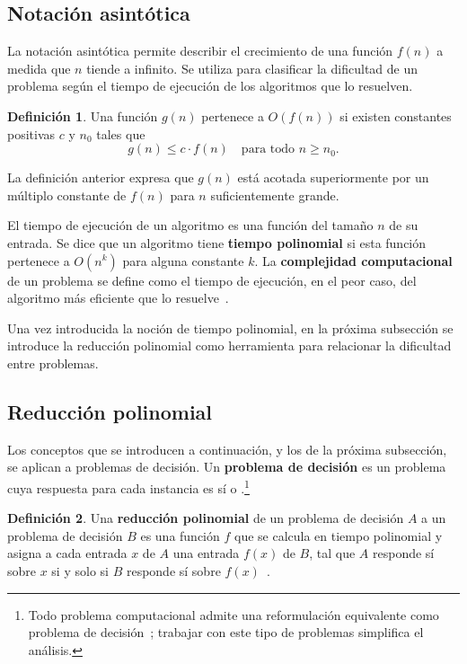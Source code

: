 \documentclass{article}
\theoremstyle{definition}
\newtheorem{definicion}{Definición}
\theoremstyle{plain}
\theoremstyle{remark}
\begin{document}
\subsection{Notación asintótica}

La notación asintótica permite describir el crecimiento de una función
$f(n)$ a medida que $n$ tiende a infinito. Se utiliza para clasificar
la dificultad de un problema según el tiempo de ejecución de los
algoritmos que lo resuelven.

\begin{definicion}
  Una función $g(n)$ pertenece a $O(f(n))$ si existen constantes positivas
  $c$ y $n_0$ tales que
  \[
    g(n) \le c \cdot f(n) \quad \text{para todo } n \ge n_0.
  \]
\end{definicion}

La definición anterior expresa que $g(n)$ está acotada superiormente
por un múltiplo constante de $f(n)$ para $n$ suficientemente grande.

El tiempo de ejecución de un algoritmo es una función del tamaño $n$
de su entrada. Se dice que un algoritmo tiene \textbf{tiempo
  polinomial} si esta función pertenece a $O(n^k)$ para alguna
constante $k$. La \textbf{complejidad computacional} de un problema
se define como el tiempo de ejecución, en el peor caso, del algoritmo
más eficiente que lo resuelve~\cite{hopcroft2006introduction}.

Una vez introducida la noción de tiempo polinomial, en la próxima
subsección se introduce la reducción polinomial como herramienta para
relacionar la dificultad entre problemas.

\subsection{Reducción polinomial}
\label{sec:reduccion}

Los conceptos que se introducen a continuación, y los de la próxima
subsección, se aplican a problemas de decisión. Un \textbf{problema
  de decisión} es un problema cuya respuesta para cada instancia es sí
o .\footnote{Todo problema computacional admite una reformulación
  equivalente como problema de decisión~\cite{hopcroft2006introduction};
  trabajar con este tipo de problemas simplifica el análisis.}

\begin{definicion}
  Una \textbf{reducción polinomial} de un problema de decisión $A$ a un
  problema de decisión $B$ es una función $f$ que se calcula en tiempo
  polinomial y asigna a cada entrada $x$ de $A$ una entrada $f(x)$ de
  $B$, tal que $A$ responde sí sobre $x$ si y solo si $B$ responde sí
  sobre $f(x)$~\cite{hopcroft2006introduction}.
\end{definicion}
\end{document}
